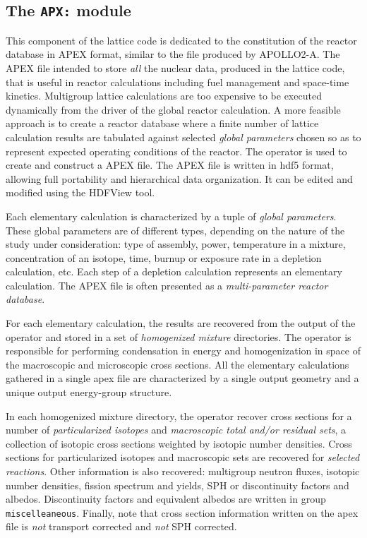 \subsection{The {\tt APX:} module}\label{sect:APEXData}

This component of the lattice code is dedicated to the constitution of the
reactor database in APEX format, similar to the file produced by APOLLO2-A.\cite{Apollo2}
The APEX file intended to store {\sl all} the nuclear data, produced in
the lattice code, that is useful
in reactor calculations including fuel management and space-time kinetics.
Multigroup lattice calculations are too expensive to be executed dynamically
from the driver of the global reactor calculation. A more feasible
approach is to create a reactor database where a finite number of lattice
calculation results are tabulated against selected {\sl global parameters}
chosen so as to represent expected operating conditions of the reactor. The
 operator is used to create and construct a {\sc APEX} file.
The APEX file is written in {\sc hdf5} format, allowing full portability and hierarchical
data organization. It can be edited and modified using the HDFView tool.

\vskip 0.1cm

Each elementary calculation is characterized by a tuple of {\sl global parameters}.
These global parameters are of different types, depending on the nature of the
study under consideration: type of assembly, power, temperature in a mixture,
concentration of an isotope, time, burnup or exposure rate in a depletion calculation,
etc. Each step of a depletion calculation represents an elementary calculation.
The {\sc APEX} file is often presented as a {\sl multi-parameter reactor database}.

\vskip 0.1cm

For each elementary calculation, the results are recovered from the output of the
 operator and stored in a set of {\sl homogenized mixture}
directories. The  operator is responsible for performing condensation
in energy and homogenization in space of the macroscopic and microscopic cross
sections. All the elementary calculations gathered in a single {\sc apex} file are
characterized by a single output geometry and a unique output energy-group
structure.

\vskip 0.1cm

In each homogenized mixture directory, the  operator recover
cross sections for a number of {\sl particularized isotopes} and {\sl macroscopic total and/or
residual sets}, a collection of isotopic cross sections weighted by isotopic number densities.
Cross sections for particularized isotopes and macroscopic sets are recovered for
{\sl selected reactions}. Other information is also recovered: multigroup neutron
fluxes, isotopic number densities, fission spectrum and yields, SPH or discontinuity factors and
albedos. Discontinuity factors and equivalent albedos are written in group {\tt miscelleaneous}.
Finally, note that cross section information written on the {\sc apex} file is {\sl not}
transport corrected and {\sl not} SPH corrected.


